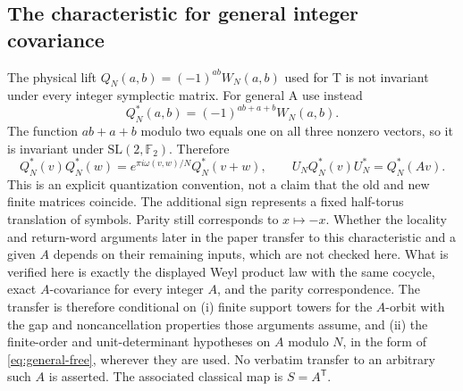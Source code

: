 \subsection{The characteristic for general integer covariance}
The physical lift $Q_N(a,b)=(-1)^{ab}W_N(a,b)$ used for T is not invariant
under every integer symplectic matrix. For general A use instead
\[
 Q_N^*(a,b)=(-1)^{ab+a+b}W_N(a,b).
\]
The function $ab+a+b$ modulo two equals one on all three nonzero vectors,
so it is invariant under $\mathrm{SL}(2,\mathbb F_2)$. Therefore
\[
 Q_N^*(v)Q_N^*(w)=e^{\pi i\omega(v,w)/N}Q_N^*(v+w),\qquad
 U_NQ_N^*(v)U_N^*=Q_N^*(Av).
\]
This is an explicit quantization convention, not a claim that the old and
new finite matrices coincide. The additional sign represents a fixed
half-torus translation of symbols. Parity still corresponds to $x\mapsto-x$.
Whether the locality and return-word arguments later in the paper transfer
to this characteristic and a given $A$ depends on their remaining inputs,
which are not checked here. What is verified here is exactly the displayed
Weyl product law with the same cocycle, exact $A$-covariance for every
integer $A$, and the parity correspondence. The transfer is therefore
conditional on (i) finite support towers for the $A$-orbit with the gap and
noncancellation properties those arguments assume, and (ii) the finite-order
and unit-determinant hypotheses on $A$ modulo $N$, in the form of
\eqref{eq:general-free}, wherever they are used. No verbatim transfer to an
arbitrary such $A$ is asserted. The associated classical map is
$S=A^{\mathsf T}$.
